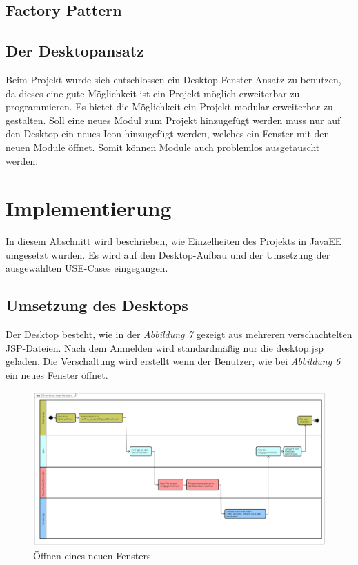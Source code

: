 \documentclass[12pt, a4paper]{article}
\begin{document}
\subsection{Factory Pattern}

\subsection{Der Desktopansatz}
Beim Projekt wurde sich entschlossen ein Desktop-Fenster-Ansatz zu benutzen, da dieses eine gute Möglichkeit ist ein Projekt möglich erweiterbar zu programmieren. Es bietet die Möglichkeit ein Projekt modular erweiterbar zu gestalten. Soll eine neues Modul zum Projekt hinzugefügt werden muss nur auf den Desktop ein neues Icon hinzugefügt werden, welches ein Fenster mit den neuen Module öffnet. Somit können Module auch problemlos ausgetauscht werden.


\section{Implementierung}
In diesem Abschnitt wird beschrieben, wie Einzelheiten des Projekts in JavaEE umgesetzt wurden. Es wird auf den Desktop-Aufbau und der Umsetzung der ausgewählten USE-Cases eingegangen.

\subsection{Umsetzung des Desktops}
Der Desktop besteht, wie in der \textit{Abbildung 7} gezeigt aus mehreren verschachtelten JSP-Dateien. Nach dem Anmelden wird standardmäßig nur die \glqq desktop.jsp\grqq{} geladen. Die Verschaltung wird erstellt wenn der Benutzer, wie bei \textit{Abbildung 6} ein neues Fenster öffnet.

\begin{figure}[H]
	\begin{center}
		\includegraphics[width=220mm,angle=90]{Bilder/fenster_oeffnen.png}
	\end{center}
	\caption{Öffnen eines neuen Fensters}
\end{figure}
\end{document}
